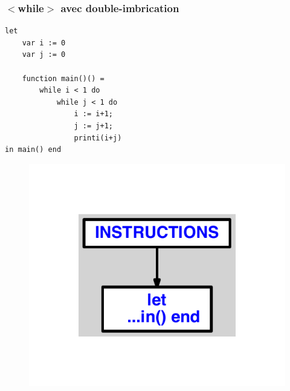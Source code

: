 \documentclass{article}
\begin{document}
\subsubsection{$ < $while$ > $ avec double-imbrication}
\begin{lstlisting}
let
	var i := 0
	var j := 0

	function main()() =
		while i < 1 do
			while j < 1 do
				i := i+1;
				j := j+1;
				printi(i+j)
in main() end
\end{lstlisting}
\newpage
\begin{figure}[H]
\centering
\includegraphics[max width=\textwidth]{ast/ast_336.pdf}
\end{figure}
\newpage
\end{document}
